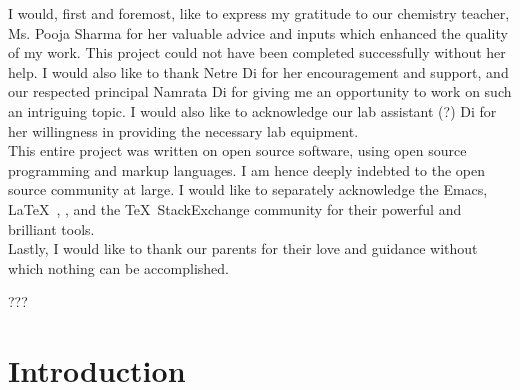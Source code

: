 \documentclass[11pt]{article}
\begin{document}
I would, first and foremost, like to express my gratitude to our chemistry teacher, Ms. Pooja
Sharma for her valuable advice and inputs which enhanced the quality of my work. This project could
not have been completed successfully without her help. I would also like to thank Netre Di for her
encouragement and support, and our respected principal Namrata Di for giving me an opportunity to
work on such an intriguing topic. I would also like to acknowledge our lab assistant (?) Di for
her willingness in providing the necessary lab equipment.\\

This entire project was written on open source software, using open source programming and markup
languages. I am hence deeply indebted to the open source community at large. I would like to
separately acknowledge the Emacs\cite{emacs}, \LaTeX\ \cite{latex},  \cite{bibtex}, and the
\TeX\ StackExchange community\cite{texSE} for their powerful and brilliant tools.\\

Lastly, I would like to thank our parents for their love and guidance without which nothing can be
accomplished.

\newpage
\tableofcontents

\newpage
\listoffigures
\listoftables
???


\newpage
\section{Introduction}
\end{document}
